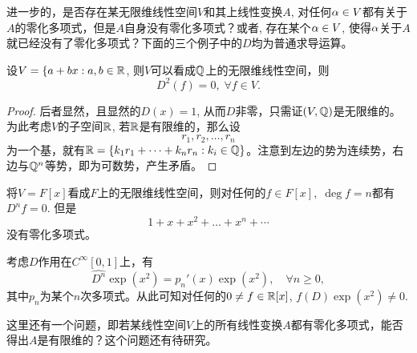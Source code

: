 进一步的，是否存在某无限维线性空间$V$和其上线性变换$A$, 对任何$\alpha\in V$都有关于$A$的零化多项式，但是$A$自身没有零化多项式？或者, 存在某个$\alpha\in V$, 使得$\alpha$关于$A$就已经没有了零化多项式？下面的三个例子中的$D$均为普通求导运算。
\begin{exa}
	设$V=\{a+bx:a,b\in\mathbb{R}$, 则$V$可以看成$\mathbb{Q}$上的无限维线性空间，则
	\[D^2(f)=0,\;\forall f\in V.\]
\end{exa}
\begin{proof}
	后者显然，且显然的$D(x)=1$, 从而$D$非零，只需证$(V,\mathbb{Q})$是无限维的。为此考虑$V$的子空间$\mathbb{R}$, 若$\mathbb{R}$是有限维的，那么设
	\[r_1,r_2,\dots,r_n\]
	为一个基，就有$\mathbb{R}=\{k_1r_1+\dots+k_nr_n:k_i\in \mathbb{Q}\}$。注意到左边的势为连续势，右边与$\mathbb{Q}^n$等势，即为可数势，产生矛盾。
\end{proof}
\begin{exa}
	将$V=F[x]$看成$F$上的无限维线性空间，则对任何的$f\in F[x],\; \deg f=n$都有$D^nf=0$. 但是
	\[1+x+x^2+\dots+x^n+\cdots\]
	没有零化多项式。
\end{exa}
\begin{exa}
	考虑$D$作用在$C^{\infty} [0,1]$上，有
	\[\hat{D^n} \exp(x^2)=p_n'(x) \exp(x^2),\quad \forall n\geq 0,\]
	其中$p_n$为某个$n$次多项式。从此可知对任何的$0\neq f\in \mathbb{R}[x]$, $f(D) \exp(x^2)\neq 0$.
\end{exa}
这里还有一个问题，即若某线性空间$V$上的所有线性变换$A$都有零化多项式，能否得出$A$是有限维的？这个问题还有待研究。